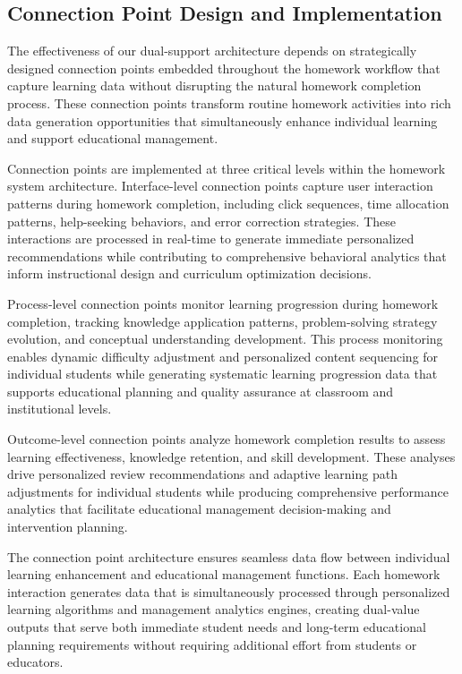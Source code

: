 \documentclass[conference]{IEEEtran}
\begin{document}
\begin{IEEEkeywords}
\subsection{Connection Point Design and Implementation}

The effectiveness of our dual-support architecture depends on strategically designed connection points embedded throughout the homework workflow that capture learning data without disrupting the natural homework completion process. These connection points transform routine homework activities into rich data generation opportunities that simultaneously enhance individual learning and support educational management.

Connection points are implemented at three critical levels within the homework system architecture. Interface-level connection points capture user interaction patterns during homework completion, including click sequences, time allocation patterns, help-seeking behaviors, and error correction strategies. These interactions are processed in real-time to generate immediate personalized recommendations while contributing to comprehensive behavioral analytics that inform instructional design and curriculum optimization decisions.

Process-level connection points monitor learning progression during homework completion, tracking knowledge application patterns, problem-solving strategy evolution, and conceptual understanding development. This process monitoring enables dynamic difficulty adjustment and personalized content sequencing for individual students while generating systematic learning progression data that supports educational planning and quality assurance at classroom and institutional levels.

Outcome-level connection points analyze homework completion results to assess learning effectiveness, knowledge retention, and skill development. These analyses drive personalized review recommendations and adaptive learning path adjustments for individual students while producing comprehensive performance analytics that facilitate educational management decision-making and intervention planning.

The connection point architecture ensures seamless data flow between individual learning enhancement and educational management functions. Each homework interaction generates data that is simultaneously processed through personalized learning algorithms and management analytics engines, creating dual-value outputs that serve both immediate student needs and long-term educational planning requirements without requiring additional effort from students or educators.


\end{IEEEkeywords}
\end{document}
